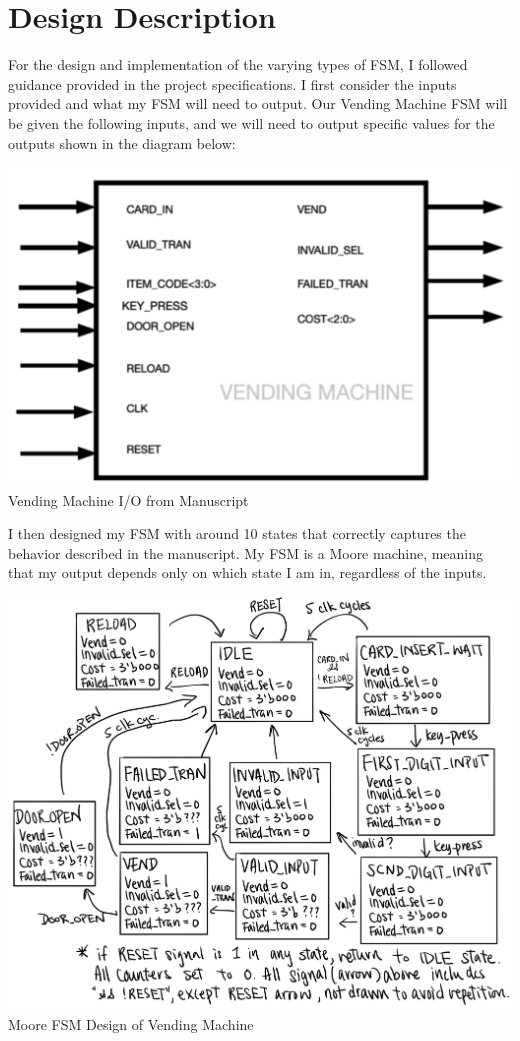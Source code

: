\documentclass{article}
\begin{document}
\section{Design Description}
For the design and implementation of the varying types of FSM, I followed guidance provided in the project specifications.  I first consider the inputs provided and what my FSM will need to output. Our Vending Machine FSM will be given the following inputs, and we will need to output specific values for the outputs shown in the diagram below: 
\begin{center}
    \includegraphics[scale=0.4]{input_outputs.png} \\
    \caption{Vending Machine I/O from Manuscript}
\end{center} 
I then designed my FSM with around 10 states that correctly captures the behavior described in the manuscript. My FSM is a Moore machine, meaning that my output depends only on which state I am in, regardless of the inputs. 
\begin{center}
    \includegraphics[scale=0.25]{FSM-diagram.jpeg} \\
    \caption{Moore FSM Design of Vending Machine}
\end{center} 
\end{document}
